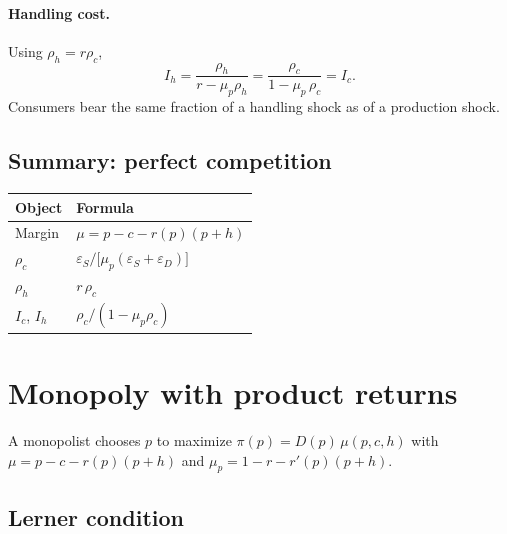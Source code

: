 \documentclass[11pt]{article}
\begin{document}
\paragraph{Handling cost.}
Using $\rho_h=r\rho_c$,
\begin{equation}
  I_h = \frac{\rho_h}{r-\mu_p\rho_h}
  = \frac{\rho_c}{1-\mu_p\,\rho_c}
  = I_c.
  \label{eq:pc-Ih}
\end{equation}
Consumers bear the same fraction of a handling shock as of a production shock.

\subsection{Summary: perfect competition}

\begin{center}
\begin{tabular}{ll}
  \hline
  Object & Formula \\
  \hline
  Margin & $\mu=p-c-r(p)(p+h)$ \\
  $\rho_c$ & $\varepsilon_S/\bigl[\mu_p(\varepsilon_S+\varepsilon_D)\bigr]$ \\
  $\rho_h$ & $r\,\rho_c$ \\
  $I_c$, $I_h$ & $\rho_c/(1-\mu_p\rho_c)$ \\
  \hline
\end{tabular}
\end{center}

\section{Monopoly with product returns}
\label{sec:monopoly-returns}

A monopolist chooses $p$ to maximize $\pi(p)=D(p)\,\mu(p,c,h)$ with
$\mu=p-c-r(p)(p+h)$ and $\mu_p=1-r-r'(p)(p+h)$.

\subsection{Lerner condition}
\end{document}
